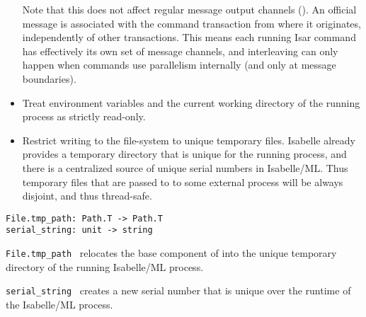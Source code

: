 \begin{isabellebody}
\begin{isamarkuptext}
\begin{itemize}
  Note that this does not affect regular message output channels
  ().  An official message is associated
  with the command transaction from where it originates, independently
  of other transactions.  This means each running Isar command has
  effectively its own set of message channels, and interleaving can
  only happen when commands use parallelism internally (and only at
  message boundaries).

  \item Treat environment variables and the current working directory
  of the running process as strictly read-only.

  \item Restrict writing to the file-system to unique temporary files.
  Isabelle already provides a temporary directory that is unique for
  the running process, and there is a centralized source of unique
  serial numbers in Isabelle/ML.  Thus temporary files that are passed
  to to some external process will be always disjoint, and thus
  thread-safe.

  \end{itemize}%
\end{isamarkuptext}%
\isamarkuptrue%
%
\isadelimmlref
%
\endisadelimmlref
%
\isatagmlref
%
\begin{isamarkuptext}%
\begin{mldecls}
  \verb|File.tmp_path: Path.T -> Path.T| \\
  \verb|serial_string: unit -> string| \\
  \end{mldecls}

  \begin{description}

  \item \verb|File.tmp_path|~ relocates the base
  component of  into the unique temporary directory of
  the running Isabelle/ML process.

  \item \verb|serial_string|~ creates a new serial number
  that is unique over the runtime of the Isabelle/ML process.


\end{description}
\end{isamarkuptext}
\end{isabellebody}
